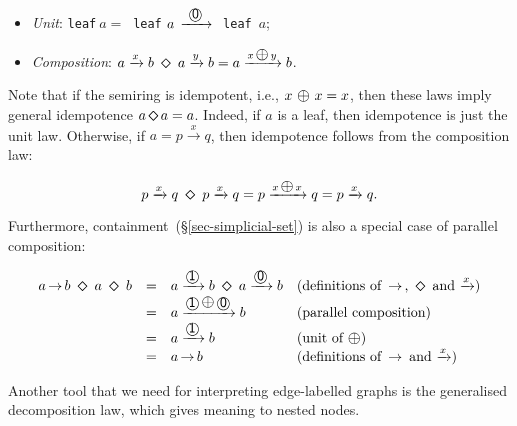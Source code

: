 \documentclass[crc,english]{programming}
\newcommand{\hcode}[1]{{\color{darkblue} \lstinline[keywordstyle={}]|#1|}} %
\newcommand{\add}{\text{\raisebox{-0.1mm}{\large $\oplus$}}}
\newcommand{\zero}{\raisebox{-0.2mm}{\textcircled{\textsf{0}}}\xspace}
\newcommand{\one}{\raisebox{-0.2mm}{\textcircled{\textsf{\hspace{-0.2mm}1}}}\xspace}
\newcommand{\dia}{\,\text{\raisebox{-0.3mm}{\Large $\diamond$}}\,}
\newcommand{\arr}{\,\text{$\rightarrow$}\,}
\begin{document}
\begin{itemize}
    \item \emph{Unit}:
    \hcode{leaf}$~a =~$\hcode{leaf}$~a\,\xrightarrow{\ \zero\ }\ $\hcode{leaf}~$a$;
    \item \emph{Composition}:
    $a \xrightarrow{x} b\ \dia\ a \xrightarrow{y} b = a \xrightarrow{x\,\add\,y} b$.
\end{itemize}

\noindent
Note that if the semiring is idempotent, i.e., $x\ \add\ x = x$, then these laws
imply general idempotence $a \dia a = a$. Indeed, if $a$ is a leaf, then
idempotence is just the unit law. Otherwise, if $a = p \xrightarrow{x} q$, then
idempotence follows from the composition law:

\vspace{-5mm}
\begin{equation*}
p \xrightarrow{x} q\ \dia\ p \xrightarrow{x} q = p \xrightarrow{x\,\add\,x} q
= p \xrightarrow{x} q.
\end{equation*}
\vspace{-5mm}

\noindent
Furthermore, containment~(\S\ref{sec-simplicial-set}) is also a special case of
parallel composition:

\vspace{-5mm}
\begin{equation*}
\begin{array}{rcll}
a \arr b\ \dia\ a\ \dia\ b & = & a \xrightarrow{\one} b\ \dia\ a \xrightarrow{\zero} b & \text{(definitions of $\arr$, $\dia$ and $\xrightarrow{x}$)}\\
 & = & a \xrightarrow{\one\,\raisebox{0.15mm}{\add}\,\zero} b & \text{(parallel composition)}\\
 & = & a \xrightarrow{\one} b & \text{(unit of $\add$)}\\
 & = & a \arr b & \text{(definitions of $\arr$ and $\xrightarrow{x}$)}
\end{array}
\end{equation*}
\vspace{-3mm}

\noindent
Another tool that we need for interpreting edge-labelled graphs is the
generalised decomposition law, which gives meaning to nested nodes.
\end{document}
